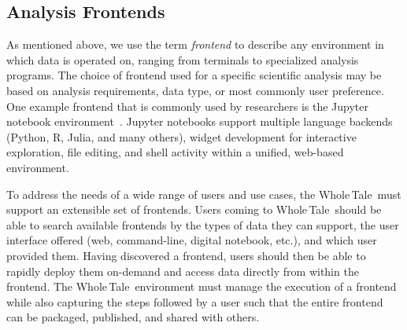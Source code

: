 \documentclass[review]{elsarticle}
\newcommand{\wt}{Whole\,Tale}
\begin{document}
\subsection{Analysis Frontends}

As mentioned above, we use the term \emph{frontend} to describe any environment in which
data is operated on, ranging from terminals to specialized analysis programs. The choice of frontend used for a specific scientific analysis
may be based on analysis requirements, data type, or most commonly user preference.
One example frontend that is commonly used by researchers is the Jupyter notebook environment~\cite{jupyter}. 
Jupyter notebooks support multiple language backends (Python, R, Julia, and many others), widget development for interactive exploration, file editing, and shell activity within a unified, web-based environment. 

To address the needs of a wide range of users and use cases, the \wt\ must support an extensible set of frontends. Users coming to \wt\ should be able to search available frontends by the types of data they can support,  the user interface offered (web, command-line, digital notebook, etc.), and which user provided them. 
Having discovered a frontend, users should then
be able to rapidly deploy them on-demand and access data
directly from within the frontend. %
The \wt\ environment must manage the execution of a frontend while
also capturing the steps followed by a user such that the entire frontend
can be packaged, published, and shared with others.
\end{document}
